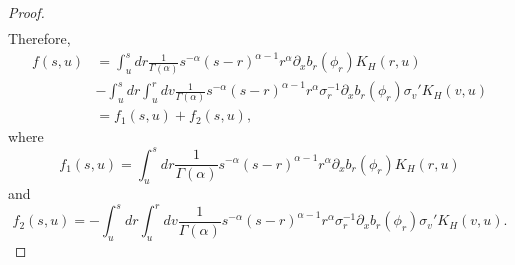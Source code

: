 \documentclass[preprint,12pt]{elsarticle}
\theoremstyle{definition}  %
\theoremstyle{plain}  %
\begin{document}
\begin{proof}
\begin{align*}
  \end{align*}
   Therefore,
   \begin{align*}
       f(s,u)&=\int_u^s dr  \frac{1}{\Gamma(\alpha)} s^{-\alpha}  (s-r)^{\alpha-1} r^{\alpha} \partial_x b_r(\phi_r)   K_H(r,u)\\
       &- \int_u^s dr \int_u^r dv
       \frac{1}{\Gamma(\alpha)} s^{-\alpha}  (s-r)^{\alpha-1} r^{\alpha} \sigma_r^{-1}\partial_x b_r(\phi_r) \sigma_v' K_H(v,u)\\
       &=f_1(s,u)+f_2(s,u),
   \end{align*}
   where
   \begin{equation}
       f_1(s,u)=\int_u^s dr  \frac{1}{\Gamma(\alpha)} s^{-\alpha}  (s-r)^{\alpha-1} r^{\alpha} \partial_x b_r(\phi_r)   K_H(r,u)   \label{apeq1}
   \end{equation}
   and
   \begin{equation}\label{apeq2}
       f_2(s,u)=- \int_u^s dr \int_u^r dv
       \frac{1}{\Gamma(\alpha)} s^{-\alpha}  (s-r)^{\alpha-1} r^{\alpha} \sigma_r^{-1}\partial_x b_r(\phi_r) \sigma_v' K_H(v,u).
   \end{equation}
\end{proof}
                               
\end{document}
